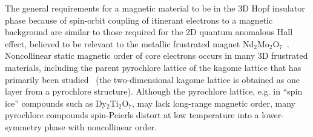 \documentclass[prl,showpacs,superscriptaddress,twocolumn,preprintnumbers,amssymb,amsfonts]{revtex4}
\begin{document}


The general requirements for a magnetic material to be in the 3D Hopf insulator phase because of spin-orbit coupling of itinerant electrons to a magnetic background are similar to those required for the 2D quantum anomalous Hall effect, believed to be relevant to the metallic frustrated magnet Nd$_2$Mo$_2$O$_7$~\cite{taguchi,ohgushi,kagomeahe}.  Noncollinear static magnetic order of core electrons occurs in many 3D frustrated materials, including the parent pyrochlore lattice of the kagome lattice that has primarily been studied~\cite{ohgushi,kagomeahe} (the two-dimensional kagome lattice is obtained as one layer from a pyrochlore structure).  Although the pyrochlore lattice, e.g. in ``spin ice'' compounds such as Dy$_2$Ti$_2$O$_7$, may lack long-range magnetic order, many pyrochlore compounds spin-Peierls distort at low temperature into a lower-symmetry phase with noncollinear order.
\end{document}
